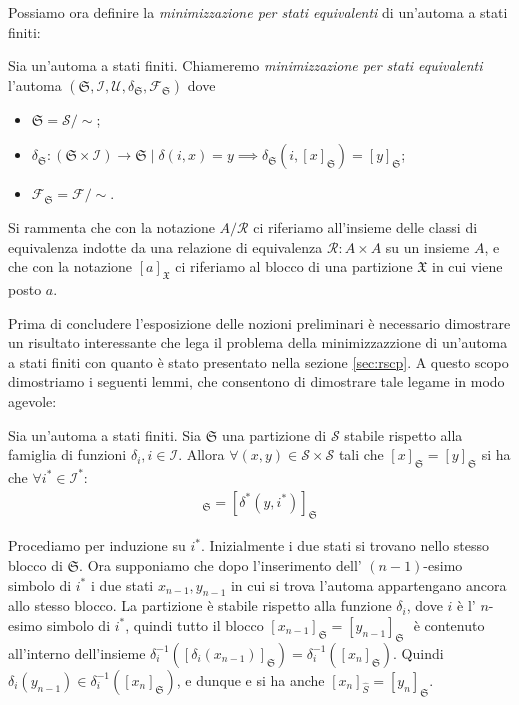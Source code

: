 Possiamo ora definire la \emph{minimizzazione per stati equivalenti} di un'automa a stati finiti:
\begin{definition}\label{def:minim_eq_states}
    Sia \automata un'automa a stati finiti. Chiameremo \emph{minimizzazione per stati equivalenti} l'automa $(\mathfrak{S}, \mathcal{I}, \mathcal{U}, \delta_\mathfrak{S}, \mathcal{F}_\mathfrak{S})$ dove
    \begin{itemize}
        \item $\mathfrak{S} = \mathcal{S} / \sim$;
        \item $\delta_\mathfrak{S} : (\mathfrak{S} \times \mathcal{I}) \to \mathfrak{S} \mid \delta(i, x) = y \implies \delta_\mathfrak{S}(i,[x]_\mathfrak{S}) = [y]_\mathfrak{S}$;
        \item $\mathcal{F}_\mathfrak{S} = \mathcal{F} / \sim$.
    \end{itemize}
\end{definition}
Si rammenta che con la notazione $A / \mathcal{R}$ ci riferiamo all'insieme delle classi di equivalenza indotte da una relazione di equivalenza $\mathcal{R} : A \times A$ su un insieme $A$, e che con la notazione $[a]_\mathfrak{X}$ ci riferiamo al blocco di una partizione $\mathfrak{X}$ in cui viene posto $a$.

Prima di concludere l'esposizione delle nozioni preliminari è necessario dimostrare un risultato interessante che lega il problema della minimizzazzione di un'automa a stati finiti con quanto è stato presentato nella sezione \ref{sec:rscp}. A questo scopo dimostriamo i seguenti lemmi, che consentono di dimostrare tale legame in modo agevole:
\begin{lemma}
    \label{lem:part_stab_stesso_blocco}
    Sia \automata un'automa a stati finiti. Sia $\mathfrak{S}$ una partizione di $\mathcal{S}$ stabile rispetto alla famiglia di funzioni $\delta_i, i \in \mathcal{I}$. Allora $\forall (x,y) \in \mathcal{S} \times \mathcal{S}$ tali che $[x]_{\mathfrak{S}} = [y]_{\mathfrak{S}}$ si ha che $\forall i^* \in \mathcal{I}^*$:
    \begin{gather*}
        [\delta^*(x,i^*)]_{\mathfrak{S}} = [\delta^*(y,i^*)]_{\mathfrak{S}}
    \end{gather*}
\end{lemma}
\begin{proof2}
    Procediamo per induzione su $i^*$. Inizialmente i due stati si trovano nello stesso blocco di $\mathfrak{S}$. Ora supponiamo che dopo l'inserimento dell' $(n-1)$-esimo simbolo di $i^*$ i due stati $x_{n-1}, y_{n-1}$ in cui si trova l'automa appartengano ancora allo stesso blocco. La partizione è stabile rispetto alla funzione $\delta_i$, dove $i$ è l' $n$-esimo simbolo di $i^*$, quindi tutto il blocco $[x_{n-1}]_{\mathfrak{S}} = [y_{n-1}]_{\mathfrak{S}}\,\,$ è contenuto all'interno dell'insieme $\delta_i^{-1}([\delta_i(x_{n-1})]_{\mathfrak{S}}) = \delta_i^{-1}([x_n]_{\mathfrak{S}})$. Quindi $\delta_i(y_{n-1}) \in \delta_i^{-1}([x_n]_{\mathfrak{S}})$, e dunque e si ha anche $[x_n]_{\widehat{S}} = [y_n]_{\mathfrak{S}}$.
\end{proof2}

